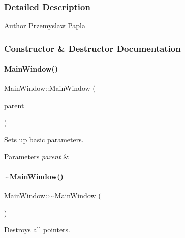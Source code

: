 \subsubsection{Detailed Description}
\begin{DoxyAuthor}{Author}
Przemyslaw Papla 
\end{DoxyAuthor}


\subsubsection{Constructor \& Destructor Documentation}
\mbox{\label{classMainWindow_a8b244be8b7b7db1b08de2a2acb9409db}} 
\paragraph{\texorpdfstring{Main\+Window()}{MainWindow()}}
{\footnotesize\ttfamily Main\+Window\+::\+Main\+Window (\begin{DoxyParamCaption}\item[{Q\+Widget $\ast$}]{parent = {} }\end{DoxyParamCaption})\hspace{0.3cm}{\ttfamily [explicit]}}



Sets up basic parameters. 


\begin{DoxyParams}{Parameters}
{\em parent} & \\
\hline
\end{DoxyParams}
\mbox{\label{classMainWindow_ae98d00a93bc118200eeef9f9bba1dba7}} 
\paragraph{\texorpdfstring{$\sim$\+Main\+Window()}{~MainWindow()}}
{\footnotesize\ttfamily Main\+Window\+::$\sim$\+Main\+Window (\begin{DoxyParamCaption}{ }\end{DoxyParamCaption})}



Destroys all pointers. 



